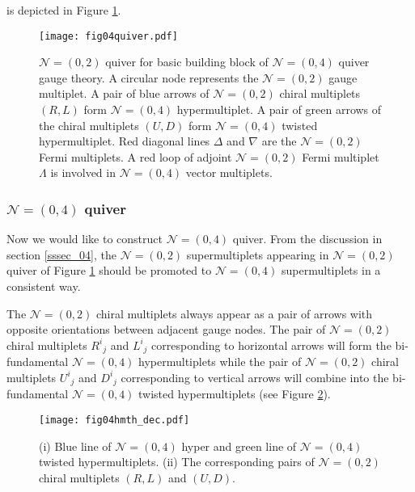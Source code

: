 \documentclass{article}
\numberwithin{equation}{section}
\begin{document}
is depicted in Figure \ref{fig04quiver}. 
\begin{figure}
\begin{center}
\texttt{[image: fig04quiver.pdf]}
\caption{$\mathcal{N}=(0,2)$ quiver for basic building block of $\mathcal{N}=(0,4)$ quiver gauge theory. 
A circular node represents the $\mathcal{N}=(0,2)$ gauge multiplet. 
A pair of blue arrows of $\mathcal{N}=(0,2)$ chiral multiplets $(R,L)$ form $\mathcal{N}=(0,4)$ hypermultiplet. 
A pair of green arrows of the chiral multiplets $(U,D)$ form $\mathcal{N}=(0,4)$ twisted hypermultiplet. 
Red diagonal lines $\Delta$ and $\nabla$ are the $\mathcal{N}=(0,2)$ Fermi multiplets. 
A red loop of adjoint $\mathcal{N}=(0,2)$ Fermi multiplet $\Lambda$ is involved in $\mathcal{N}=(0,4)$ vector multiplets. }
\label{fig04quiver}
\end{center}
\end{figure}




\subsubsection{$\mathcal{N}=(0,4)$ quiver}
\label{subsec_04quiver}
Now we would like to construct $\mathcal{N}=(0,4)$ quiver. 
From the discussion in section \ref{sssec_04}, 
the $\mathcal{N}=(0,2)$ supermultiplets appearing in $\mathcal{N}=(0,2)$ quiver of Figure \ref{fig04quiver} should be promoted to 
$\mathcal{N}=(0,4)$ supermultiplets in a consistent way. 

The $\mathcal{N}=(0,2)$ chiral multiplets always appear as a pair of arrows with opposite orientations between adjacent gauge nodes. 
The pair of $\mathcal{N}=(0,2)$ chiral multiplets ${R^{i}}_{j}$ and ${L^{i}}_{j}$ corresponding to horizontal arrows 
will form the bi-fundamental $\mathcal{N}=(0,4)$ hypermultiplets 
while the pair of $\mathcal{N}=(0,2)$ chiral multiplets ${U^{i}}_{j}$ and ${D^{i}}_{j}$ corresponding to vertical arrows  
will combine into the bi-fundamental $\mathcal{N}=(0,4)$ twisted hypermultiplets 
(see Figure \ref{fig04hmth_dec}). 

\begin{figure}
\begin{center}
\texttt{[image: fig04hmth\_dec.pdf]}
\caption{
(i) Blue line of $\mathcal{N}=(0,4)$ hyper and green line of $\mathcal{N}=(0,4)$ twisted hypermultiplets.  
(ii) The corresponding pairs of $\mathcal{N}=(0,2)$ chiral multiplets $(R,L)$ and $(U,D)$.}
\label{fig04hmth_dec}
\end{center}
\end{figure}
\end{document}
